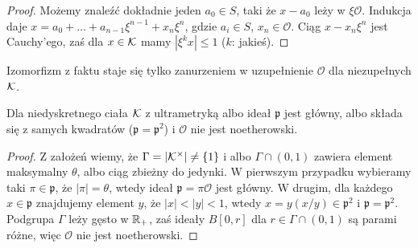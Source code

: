 \begin{proof}
	Możemy znaleźć dokładnie jeden $a_0 \in S$, taki że $x - a_0$ leży w $\xi \mathcal O$. 
	Indukcja daje $x = a_0 + \ldots + a_{n-1} \xi^{n-1} + x_n \xi^n$, gdzie $a_i \in S$, $x_n \in \mathcal O$.
	Ciąg $x - x_n \xi^n$ jest Cauchy'ego, zaś dla $x \in \mathcal K$ mamy $|\xi^k x| \le 1$ ($k$: jakieś).
\end{proof}


Izomorfizm z faktu staje się tylko zanurzeniem w uzupełnienie $\mathcal O$ dla niezupełnych $\mathcal K$.

\begin{fakt} %
	Dla niedyskretnego ciała $\mathcal K$ z ultrametryką albo ideał $\mathfrak p$ jest główny, albo składa się z samych kwadratów ($\mathfrak p = \mathfrak p^2$) i $\mathcal O$ nie jest noetherowski.
\end{fakt}

\begin{proof}
	Z założeń wiemy, że $\Gamma = |\mathcal K^\times| \neq \{1\}$ i albo $\Gamma \cap (0, 1)$ zawiera element maksymalny $\theta$, albo ciąg zbieżny do jedynki.
	W pierwszym przypadku wybieramy taki $\pi \in \mathfrak p$, że $|\pi| = \theta$, wtedy ideał $\mathfrak p = \pi \mathcal O$ jest główny.
	W drugim, dla każdego $x \in \mathfrak p$ znajdujemy element $y$, że $|x| < |y| < 1$, wtedy $x = y (x/y) \in \mathfrak p^2$ i $\mathfrak p = \mathfrak p^2$.
	Podgrupa $\Gamma$ leży gęsto w $\mathbb R_+$, zaś ideały $B[0, r]$ dla $r \in \Gamma \cap (0,1)$ są parami różne, więc $\mathcal O$ nie jest noetherowski.
\end{proof}